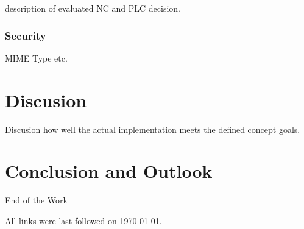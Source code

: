 \documentclass[
a4paper,
twoside,
bibliography=totoc,
headsepline,
cleardoublepage=empty,
parskip=half,
draft=false
]{scrbook}
\begin{document}
				description of evaluated NC and PLC decision.
				
			\subsection{Security} \label{subsec:security}
			
				MIME Type etc.
				
	\chapter{Discusion} \label{ch:discusion}
	
		Discusion how well the actual implementation meets the defined concept goals.
		
	\chapter{Conclusion and Outlook} \label{ch:conclusion_and_outlook}
	
		End of the Work
		
	\clearpage
	
	
	
%	
%	
%	
%	
%	
%	
%	
%	
%	
%	
%	
	
	
	
	\printbibliography
	
	All links were last followed on \today.
	
	\pagestyle{empty}
	\renewcommand*{\chapterpagestyle}{empty}
	\Versicherung
\end{document}
